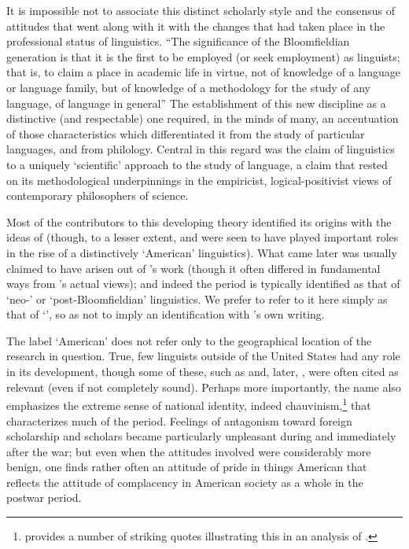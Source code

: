 It is impossible not to associate this distinct scholarly style and
the consensus of attitudes that went along with it with the changes
that had taken place in the professional status of linguistics. ``The
significance of the Bloomfieldian generation is that it is the first
to be employed (or seek employment) as linguists; that is, to claim a
place in academic life in virtue, not of knowledge of a language or
language family, but of knowledge of a methodology for the study of
any language, of language in general''
\citep[117]{hymes.fought81:structuralism} The establishment of this
new discipline as a distinctive (and respectable) one required, in the
minds of many, an accentuation of those characteristics which
differentiated it from the study of particular languages, and from
philology. Central in this regard was the claim of linguistics to a
uniquely `scientific' approach to the study of language, a claim that
rested on its methodological underpinnings in the empiricist,
logical-positivist views of contemporary philosophers of science.

Most of the contributors to this developing theory identified its
origins with the ideas of {\Bloomfield} (though, to a lesser extent, {\Boas}
and {\Sapir} were seen to have played important roles in the rise of a
distinctively `American' linguistics). What came later was usually
claimed to have arisen out of {\Bloomfield}'s work (though it often
differed in fundamental ways from {\Bloomfield}'s actual views); and
indeed the period is typically identified as that of `neo-' or
`post-Bloomfieldian' linguistics. We prefer to refer to it here simply
as that of `', so as not to imply an
identification with {\Bloomfield}'s own writing.

The label `American' does not refer only to the geographical location
of the research in question. True, few linguists outside of the United
States had any role in its development, though some of these, such as
{\Trubetzkoy} and, later, {\Hjelmslev}, were often cited as relevant (even
if not completely sound). Perhaps more importantly, the name also
emphasizes the extreme sense of national identity, indeed
chauvinism,\footnote{\citet{Newmeyer19:joos.reader} provides a number
  of striking quotes illustrating this in an analysis of
  \citealt{joos57:readings}.}  that characterizes much of the
period. Feelings of antagonism toward foreign scholarship and scholars
became particularly unpleasant during and immediately after the war;
but even when the attitudes involved were considerably more benign,
one finds rather often an attitude of pride in things American that
reflects the attitude of complacency in American society as a whole in
the postwar period.

